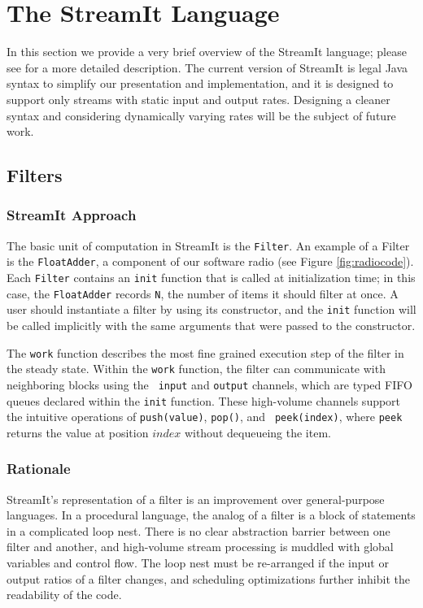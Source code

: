 \section{The StreamIt Language}

In this section we provide a very brief overview of the StreamIt
language; please see \cite{streamittech} for a more detailed
description.  The current version of StreamIt is legal Java syntax to
simplify our presentation and implementation, and it is designed to
support only streams with static input and output rates.  Designing a
cleaner syntax and considering dynamically varying rates will be the
subject of future work.

\subsection{Filters}

\subsubsection{StreamIt Approach}

The basic unit of computation in StreamIt is the {\tt Filter}.  An
example of a Filter is the {\tt FloatAdder}, a component of our
software radio (see Figure \ref{fig:radiocode}).  Each {\tt Filter}
contains an {\tt init} function that is called at initialization time;
in this case, the {\tt FloatAdder} records {\tt N}, the number of
items it should filter at once.  A user should instantiate a filter by
using its constructor, and the {\tt init} function will be called
implicitly with the same arguments that were passed to the
constructor.

The {\tt work} function describes the most fine grained execution step
of the filter in the steady state.  Within the {\tt work} function,
the filter can communicate with neighboring blocks using the {\tt
input} and {\tt output} channels, which are typed FIFO queues declared
within the {\tt init} function.  These high-volume channels support
the intuitive operations of {\tt push(value)}, {\tt pop()}, and {\tt
peek(index)}, where {\tt peek} returns the value at position $index$
without dequeueing the item.

\subsubsection{Rationale}

StreamIt's representation of a filter is an improvement over
general-purpose languages.  In a procedural language, the analog of a
filter is a block of statements in a complicated loop nest.  There is
no clear abstraction barrier between one filter and another, and
high-volume stream processing is muddled with global variables and
control flow. The loop nest must be re-arranged if the input or output
ratios of a filter changes, and scheduling optimizations further
inhibit the readability of the code.

